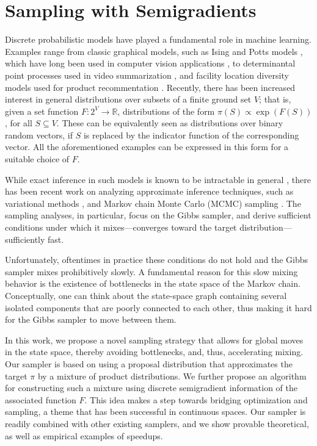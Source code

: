 \chapter{Sampling with Semigradients} \label{ch:m3}
Discrete probabilistic models have played a fundamental role in machine learning.
Examples range from classic graphical models, such as Ising and Potts models \citep{koller09}, which have long been used in computer vision applications \citep{boykov01}, to determinantal point processes \citep{kulesza12} used in video summarization \citep{gong14}, and facility location diversity models used for product recommentation \citep{tschiatschek16}.
Recently, there has been increased interest in general distributions over subsets of a finite ground set $V$; that is, given a set function $F : 2^V \to \mathbb{R}$, distributions of the form $\pi(S) \propto \exp(F(S))$, for all $S \subseteq V$.
These can be equivalently seen as distributions over binary random vectors, if $S$ is replaced by the indicator function of the corresponding vector.
All the aforementioned examples can be expressed in this form for a suitable choice of $F$.

While exact inference in such models is known to be intractable in general \citep{jerrum93}, there has been recent work on analyzing approximate inference techniques, such as variational methods \citep{djolonga14, djolonga16mixed}, and Markov chain Monte Carlo (MCMC) sampling \citep{gotovos15, rebeschini15}.
The sampling analyses, in particular, focus on the Gibbs sampler, and derive sufficient conditions under which it mixes---converges toward the target distribution---sufficiently fast.

Unfortunately, oftentimes in practice these conditions do not hold and the Gibbs sampler mixes prohibitively slowly.
A fundamental reason for this slow mixing behavior is the existence of bottlenecks in the state space of the Markov chain.
Conceptually, one can think about the state-space graph containing several isolated components that are poorly connected to each other, thus making it hard for the Gibbs sampler to move between them.

In this work, we propose a novel sampling strategy that allows for global moves in the state space, thereby avoiding bottlenecks, and, thus, accelerating mixing.
Our sampler is based on using a proposal distribution that approximates the target $\pi$ by a mixture of product distributions.
We further propose an algorithm for constructing such a mixture using discrete semigradient information of the associated function $F$.
This idea makes a step towards bridging optimization and sampling, a theme that has been successful in continuous spaces.
Our sampler is readily combined with other existing samplers, and we show provable theoretical, as well as empirical examples of speedups.

